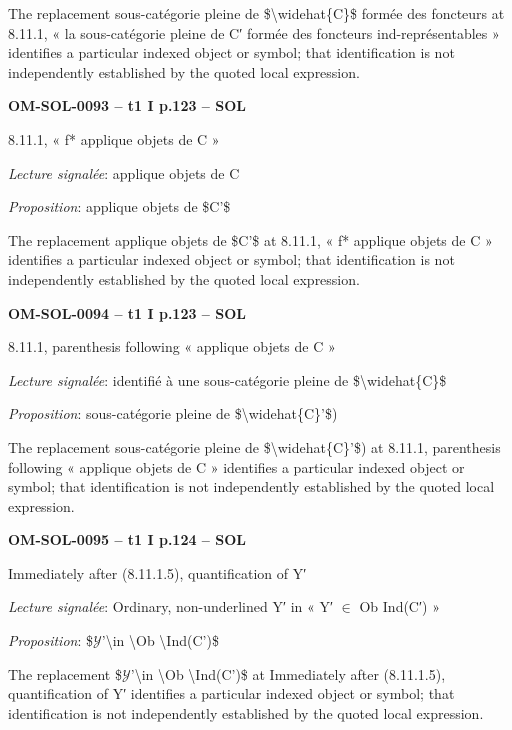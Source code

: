 The replacement sous-catégorie pleine de \$\textbackslash{}widehat\{C\}\$ formée des foncteurs at 8.11.1, « la sous-catégorie pleine de C′ formée des foncteurs ind-représentables » identifies a particular indexed object or symbol; that identification is not independently established by the quoted local expression.\par
\par\noindent\textbf{OM-SOL-0093 -- t1 I p.123 -- SOL}\par
8.11.1, « f* applique objets de C »\par
\emph{Lecture signalée}: applique objets de C\par
\emph{Proposition}: applique objets de \$C'\$\par
The replacement applique objets de \$C'\$ at 8.11.1, « f* applique objets de C » identifies a particular indexed object or symbol; that identification is not independently established by the quoted local expression.\par
\par\noindent\textbf{OM-SOL-0094 -- t1 I p.123 -- SOL}\par
8.11.1, parenthesis following « applique objets de C »\par
\emph{Lecture signalée}: identifié à une sous-catégorie pleine de \$\textbackslash{}widehat\{C\}\$\par
\emph{Proposition}: sous-catégorie pleine de \$\textbackslash{}widehat\{C\}'\$)\par
The replacement sous-catégorie pleine de \$\textbackslash{}widehat\{C\}'\$) at 8.11.1, parenthesis following « applique objets de C » identifies a particular indexed object or symbol; that identification is not independently established by the quoted local expression.\par
\par\noindent\textbf{OM-SOL-0095 -- t1 I p.124 -- SOL}\par
Immediately after (8.11.1.5), quantification of Y′\par
\emph{Lecture signalée}: Ordinary, non-underlined Y′ in « Y′ \ensuremath{\in} Ob Ind(C′) »\par
\emph{Proposition}: \$\ensuremath{𝒴}'\textbackslash{}in \textbackslash{}Ob \textbackslash{}Ind(C')\$\par
The replacement \$\ensuremath{𝒴}'\textbackslash{}in \textbackslash{}Ob \textbackslash{}Ind(C')\$ at Immediately after (8.11.1.5), quantification of Y′ identifies a particular indexed object or symbol; that identification is not independently established by the quoted local expression.\par
